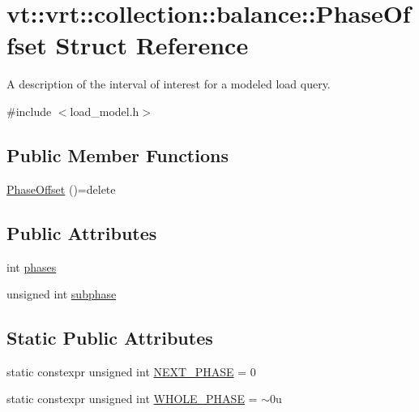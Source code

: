 \hypertarget{structvt_1_1vrt_1_1collection_1_1balance_1_1_phase_offset}{}\section{vt\+:\+:vrt\+:\+:collection\+:\+:balance\+:\+:Phase\+Offset Struct Reference}
\label{structvt_1_1vrt_1_1collection_1_1balance_1_1_phase_offset}


A description of the interval of interest for a modeled load query.  




{\ttfamily \#include $<$load\+\_\+model.\+h$>$}

\subsection*{Public Member Functions}
\begin{DoxyCompactItemize}
\item 
\hyperlink{structvt_1_1vrt_1_1collection_1_1balance_1_1_phase_offset_a3a8f4f20292bf178c5d5902f405f88d6}{Phase\+Offset} ()=delete
\end{DoxyCompactItemize}
\subsection*{Public Attributes}
\begin{DoxyCompactItemize}
\item 
int \hyperlink{structvt_1_1vrt_1_1collection_1_1balance_1_1_phase_offset_a8548a90b20b426e5986f20beb139d3d1}{phases}
\item 
unsigned int \hyperlink{structvt_1_1vrt_1_1collection_1_1balance_1_1_phase_offset_a61facb996e52cae3e9a8c9d4d3091ee0}{subphase}
\end{DoxyCompactItemize}
\subsection*{Static Public Attributes}
\begin{DoxyCompactItemize}
\item 
static constexpr unsigned int \hyperlink{structvt_1_1vrt_1_1collection_1_1balance_1_1_phase_offset_aa8a8c4379ab878392c4f65212e92f581}{N\+E\+X\+T\+\_\+\+P\+H\+A\+SE} = 0
\item 
static constexpr unsigned int \hyperlink{structvt_1_1vrt_1_1collection_1_1balance_1_1_phase_offset_a0eb2d2db9e2d4329e2f76332c1fb2429}{W\+H\+O\+L\+E\+\_\+\+P\+H\+A\+SE} = $\sim$0u
\end{DoxyCompactItemize}



